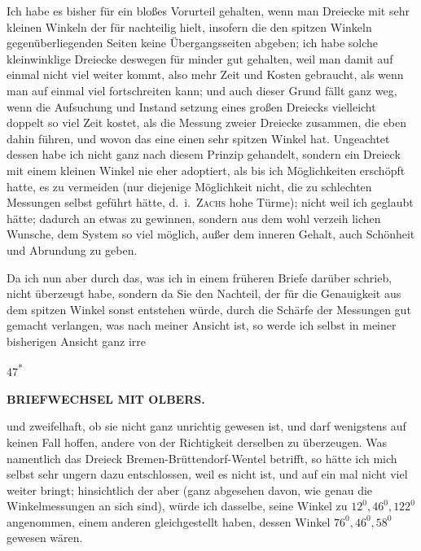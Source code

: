 \par\noindent\hspace*{\parindent}Ich habe es bisher für ein bloßes Vorurteil gehalten, wenn man Dreiecke
mit sehr kleinen Winkeln der  für nachteilig hielt, insofern
die den spitzen Winkeln gegenüberliegenden Seiten keine Übergangsseiten
abgeben; ich habe solche kleinwinklige Dreiecke  deswegen für minder
gut gehalten, weil man damit auf einmal nicht viel weiter kommt, also mehr
Zeit und Kosten gebraucht, als wenn man auf einmal viel fortschreiten kann;
und auch dieser Grund fällt ganz weg, wenn die Aufsuchung und Instand\-%
setzung eines großen Dreiecks vielleicht doppelt so viel Zeit kostet, als die
Messung zweier Dreiecke zusammen, die eben dahin führen, und wovon das
eine einen sehr spitzen Winkel hat. Ungeachtet dessen habe ich nicht ganz
nach diesem Prinzip gehandelt, sondern ein Dreieck mit einem kleinen Winkel
nie eher adoptiert, als bis ich  Möglichkeiten erschöpft hatte, es zu
vermeiden (nur diejenige Möglichkeit nicht, die zu schlechten Messungen
selbst geführt hätte, d.~i.\ \textsc{Zachs} hohe Türme); nicht weil ich geglaubt hätte;
dadurch an  etwas zu gewinnen, sondern aus dem wohl verzeih\-%
lichen Wunsche, dem System so viel möglich, außer dem inneren Gehalt, auch
Schönheit und Abrundung zu geben.

\par\noindent\hspace*{\parindent}Da ich nun aber  durch das, was ich in einem früheren Briefe
darüber schrieb, nicht überzeugt habe, sondern da Sie den Nachteil, der für
die Genauigkeit aus dem spitzen Winkel sonst entstehen würde, durch die
Schärfe der Messungen gut gemacht verlangen, was nach meiner Ansicht
 ist, so werde ich selbst in meiner bisherigen Ansicht ganz irre
\par\smallskip\noindent\hfill{\footnotesize 47\textsuperscript{*}}\par
\clearpage
{}\hfill{\small\textbf{BRIEFWECHSEL MIT OLBERS.}}\par\medskip
\noindent und zweifelhaft, ob sie nicht ganz unrichtig gewesen ist, und darf wenigstens
auf keinen Fall hoffen, andere von der Richtigkeit derselben zu überzeugen. Was
namentlich das Dreieck Bremen-Brüttendorf-Wentel betrifft, so hätte ich mich
selbst sehr ungern dazu entschlossen, weil es nicht  ist, und auf ein\-%
mal nicht viel weiter bringt; hinsichtlich der  aber (ganz
abgesehen davon, wie genau die Winkelmessungen an sich sind), würde ich
dasselbe, seine Winkel zu \(12^{0},46^{0},122^{0}\) angenommen,  einem
anderen gleichgestellt haben, dessen Winkel \(76^{0},46^{0},58^{0}\) gewesen wären.
